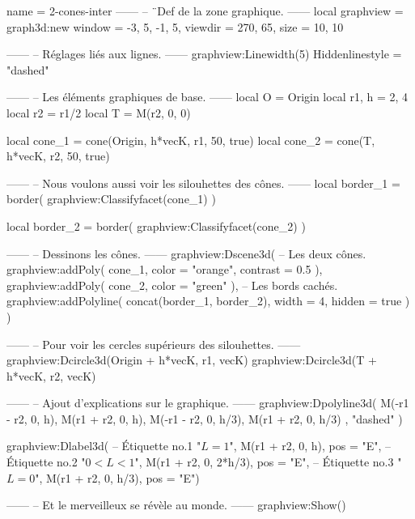 \documentclass{standalone}
\begin{document}
\begin{luadraw}{name = 2-cones-inter}
------
-- ¨Def de la zone graphique.
------
local graphview = graph3d:new{
  window  = {-3, 5, -1, 5},
  viewdir = {270, 65},
  size    = {10, 10}
}

------
-- Réglages liés aux lignes.
------
graphview:Linewidth(5)
Hiddenlinestyle = "dashed"

------
-- Les éléments graphiques de base.
------
local O     = Origin
local r1, h =  2, 4
local r2    = r1/2
local T     =  M(r2, 0, 0)

local cone_1 = cone(Origin, h*vecK, r1, 50, true)
local cone_2 = cone(T, h*vecK, r2, 50, true)

------
-- Nous voulons aussi voir les silouhettes des cônes.
------
local border_1 = border(
  graphview:Classifyfacet(cone_1)
)

local border_2 = border(
  graphview:Classifyfacet(cone_2)
)

------
-- Dessinons les cônes.
------
graphview:Dscene3d(
-- Les deux cônes.
  graphview:addPoly(
    cone_1,
    {
      color    = "orange",
      contrast = 0.5
    }),
  graphview:addPoly(
    cone_2,
    {
      color = "green"
    }),
-- Les bords cachés.
  graphview:addPolyline(
    concat(border_1, border_2),
    {
      width  = 4,
      hidden = true
    })
)

------
-- Pour voir les cercles supérieurs des silouhettes.
------
graphview:Dcircle3d(Origin + h*vecK, r1, vecK)
graphview:Dcircle3d(T + h*vecK, r2, vecK)

------
-- Ajout d'explications sur le graphique.
------
graphview:Dpolyline3d(
  {
    {M(-r1 - r2,  0,  h), M(r1 + r2,  0,  h)},
    {M(-r1 - r2,  0,  h/3), M(r1 + r2,  0,  h/3)}
  },
  "dashed"
)

graphview:Dlabel3d(
-- Étiquette no.1
  "$L = 1$",
  M(r1 + r2, 0, h),
  {pos = "E"},
-- Étiquette no.2
  "$0 < L <1$",
  M(r1 + r2, 0, 2*h/3),
  {pos = "E"},
-- Étiquette no.3
  "$L = 0$",
  M(r1 + r2, 0, h/3),
  {pos = "E"})

------
-- Et le merveilleux se révèle au monde.
------
graphview:Show()
\end{luadraw}
\end{document}
